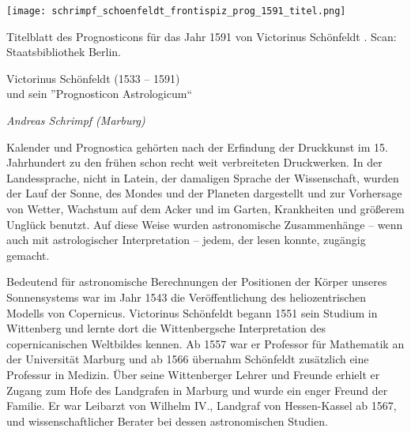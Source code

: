 \documentclass[12pt]{article}
\begin{document}

\begin{figure*}[h]
	\begin{center}
	\texttt{[image: schrimpf\_schoenfeldt\_frontispiz\_prog\_1591\_titel.png]}
		\label{prog_1591}

	\vspace{1cm}
			
	Titelblatt des Prognosticons für das Jahr 1591 von Victorinus Schönfeldt \cite{Schoenfeldt1590a}. Scan: Staatsbibliothek Berlin.
	\end{center}

\end{figure*}

\pagebreak

{\Large

\noindent	
Victorinus Schönfeldt (1533 -- 1591) \\und sein ''Prognosticon Astrologicum`` 
}

{\em \noindent Andreas Schrimpf (Marburg) }



\vspace{5mm}

Kalender und Prognostica gehörten nach der Erfindung der Druckkunst im 15. Jahrhundert zu den frühen schon recht weit verbreiteten Druckwerken. In der Landessprache, nicht in Latein, der damaligen Sprache der Wissenschaft, wurden der Lauf der Sonne, des Mondes und der Planeten dargestellt und zur Vorhersage von Wetter, Wachstum auf dem Acker und im Garten, Krankheiten und größerem Unglück benutzt. Auf diese Weise wurden astronomische Zusammenhänge – wenn auch mit astrologischer Interpretation – jedem, der lesen konnte, zugängig gemacht. 

Bedeutend für astronomische Berechnungen der Positionen der Körper unseres Sonnensystems war im Jahr 1543 die Veröffentlichung des heliozentrischen Modells von Copernicus. Victorinus Schönfeldt begann 1551 sein Studium in Wittenberg und lernte dort die Wittenbergsche Interpretation des copernicanischen Weltbildes kennen. Ab 1557 war er Professor für Mathematik an der Universität Marburg und ab 1566 übernahm Schönfeldt zusätzlich eine Professur in Medizin. Über seine Wittenberger Lehrer und Freunde erhielt er Zugang zum Hofe des Landgrafen in Marburg und wurde ein enger Freund der Familie. Er war Leibarzt von Wilhelm IV., Landgraf von Hessen-Kassel ab 1567, und wissenschaftlicher Berater bei dessen astronomischen Studien.
\end{document}
